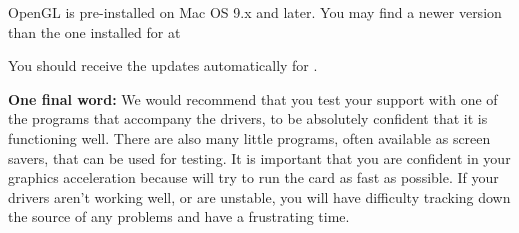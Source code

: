 OpenGL is pre-installed on Mac OS 9.x and later. You may find a newer version than the one installed for  at
\medskip

\medskip

You should receive the updates automatically for .


 \noindent
 \textbf{One final word:} We would recommend that you test your  support
 with one of the programs that accompany the drivers, to be absolutely confident
that it is functioning well. There are also many little programs, often available as
screen savers, that can be used for testing.  It is important that you are confident in
your graphics acceleration because \FlightGear{} will try to run the card as fast as
possible. If your drivers aren't working well, or are unstable, you will have difficulty
tracking down the source of any problems and have a frustrating time.

